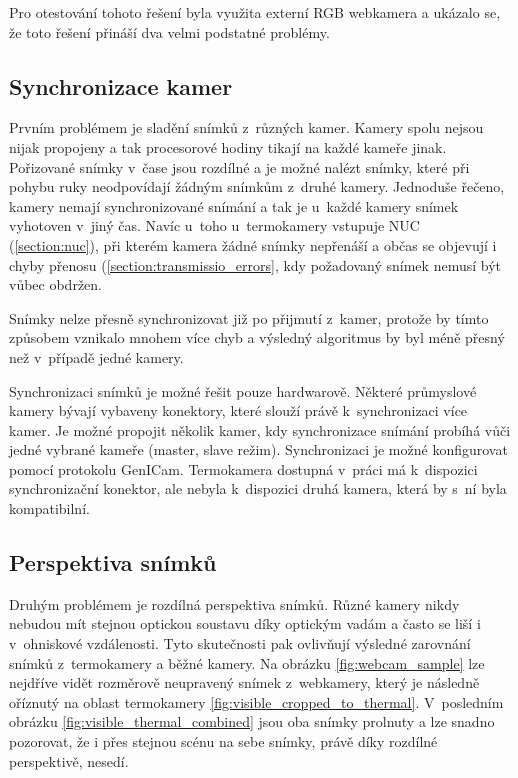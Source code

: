 Pro otestování tohoto řešení byla využita externí RGB webkamera a ukázalo se, že toto řešení přináší dva velmi podstatné problémy.

    \subsection{Synchronizace kamer}
    Prvním problémem je sladění snímků z~různých kamer. Kamery spolu nejsou nijak propojeny a tak procesorové hodiny tikají na každé kameře jinak. Pořizované snímky v~čase jsou rozdílné a je možné nalézt snímky, které při pohybu ruky neodpovídají žádným snímkům z~druhé kamery. Jednoduše řečeno, kamery nemají synchronizované snímání a tak je u~každé kamery snímek vyhotoven v~jiný čas. Navíc u~toho u~termokamery vstupuje NUC (\ref{section:nuc}), při kterém kamera žádné snímky nepřenáší a občas se objevují i chyby přenosu (\ref{section:transmissio_errors}, kdy požadovaný snímek nemusí být vůbec obdržen. 

    Snímky nelze přesně synchronizovat již po přijmutí z~kamer, protože by tímto způsobem vznikalo mnohem více chyb a výsledný algoritmus by byl méně přesný než v~případě jedné kamery.

    Synchronizaci snímků je možné řešit pouze hardwarově. Některé průmyslové kamery bývají vybaveny konektory, které slouží právě k~synchronizaci více kamer. Je možné propojit několik kamer, kdy synchronizace snímání probíhá vůči jedné vybrané kameře (master, slave režim). Synchronizaci je možné konfigurovat pomocí protokolu GenICam. Termokamera dostupná v~práci má k~dispozici synchronizační konektor, ale nebyla k~dispozici druhá kamera, která by s~ní byla kompatibilní.

	\subsection{Perspektiva snímků} 
    Druhým problémem je rozdílná perspektiva snímků. Různé kamery nikdy nebudou mít stejnou optickou soustavu díky optickým vadám a často se liší i v~ohniskové vzdálenosti. Tyto skutečnosti pak ovlivňují výsledné zarovnání snímků z~termokamery a běžné kamery. Na obrázku \ref{fig:webcam_sample} lze nejdříve vidět rozměrově neupravený snímek z~webkamery, který je následně oříznutý na oblast termokamery \ref{fig:visible_cropped_to_thermal}. V~posledním obrázku \ref{fig:visible_thermal_combined} jsou oba snímky prolnuty a lze snadno pozorovat, že i přes stejnou scénu na sebe snímky, právě díky rozdílné perspektivě, nesedí.

